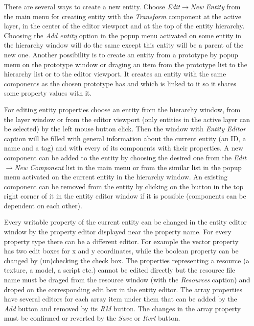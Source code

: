 There are several ways to create a new entity. Choose \emph{Edit}$\rightarrow$\emph{New Entity} from the main menu for creating entity with the \emph{Transform} component at the active layer, in the center of the editor viewport and at the top of the entity hierarchy. Choosing the \emph{Add entity} option in the popup menu activated on some entity in the hierarchy window will do the same except this entity will be a parent of the new one. Another possibility is to create an entity from a prototype by popup menu on the prototype window or draging an item from the prototype list to the hierarchy list or to the editor viewport. It creates an entity with the same components as the chosen prototype has and which is linked to it so it shares some property values with it.

For editing entity properties choose an entity from the hierarchy window, from the layer window or from the editor viewport (only entities in the active layer can be selected) by the left mouse button click. Then the window with \emph{Entity Editor} caption will be filled with general information about the current entity (an ID, a name and a tag) and with every of its components with their properties. A new component can be added to the entity by choosing the desired one from the \emph{Edit}$\rightarrow$\emph{New Component} list in the main menu or from the similar list in the popup menu activated on the current entity in the hierarchy window. An existing component can be removed from the entity by clicking on the button in the top right corner of it in the entity editor window if it is possible (components can be dependent on each other).

Every writable property of the current entity can be changed in the entity editor window by the property editor displayed near the property name. For every property type there can be a different editor. For example the vector property has two edit boxes for x and y coordinates, while the boolean property can be changed by (un)checking the check box. The properties representing a resource (a texture, a model, a script etc.) cannot be edited directly but the resource file name must be draged from the resource window (with the \emph{Resources} caption) and droped on the corresponding edit box in the entity editor. The array properties have several editors for each array item under them that can be added by the \emph{Add} button and removed by its \emph{RM} button. The changes in the array property must be confirmed or reverted by the \emph{Save} or \emph{Rvrt} button.

